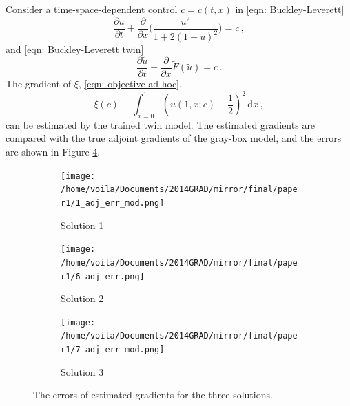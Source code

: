 Consider a time-space-dependent control $c=c(t,x)$ in \eqref{eqn: Buckley-Leverett} 
\begin{equation*}
    \frac{\partial u}{\partial t} + \frac{\partial}{\partial x}\Big(
    \frac{u^2}{1+ 2(1-u)^2} \Big) = c\,,
\end{equation*}
and 
\eqref{eqn: Buckley-Leverett twin}
\begin{equation*}
    \frac{\partial \tilde{u}}{\partial t} + \frac{\partial}{\partial x}\tilde{F}(\tilde{u})
    = c\,.
\end{equation*}
The gradient of $\xi$, \eqref{eqn: objective ad hoc}, 
\begin{equation*}
    \xi(c) \equiv \int_{x=0}^1 \left(u(1,x; c) - \frac{1}{2}\right)^2 \,\textrm{d}x\,,
\end{equation*}
can be estimated by the trained twin model. The estimated gradients are compared with the true adjoint
gradients of the gray-box model, and the errors are shown in Figure \ref{fig: adap basis grad err BL}.\\
\begin{figure}[htbp]\begin{center}
    \begin{subfigure}[t]{.32\textwidth}
        \centering
        \texttt{[image: /home/voila/Documents/2014GRAD/mirror/final/paper1/1\_adj\_err\_mod.png]}
        \caption{Solution 1}
        \label{fig: grad BL 1}
    \end{subfigure}
    \begin{subfigure}[t]{.32\textwidth}     
        \centering
        \texttt{[image: /home/voila/Documents/2014GRAD/mirror/final/paper1/6\_adj\_err.png]}
        \caption{Solution 2}
        \label{fig: grad BL 2}
    \end{subfigure}
    \begin{subfigure}[t]{.32\textwidth}
        \centering
        \texttt{[image: /home/voila/Documents/2014GRAD/mirror/final/paper1/7\_adj\_err\_mod.png]}
        \caption{Solution 3}
        \label{fig: grad BL 3}
    \end{subfigure}
    \caption{The errors of estimated gradients for the three solutions.}
    \label{fig: adap basis grad err BL}
\end{center}\end{figure}

